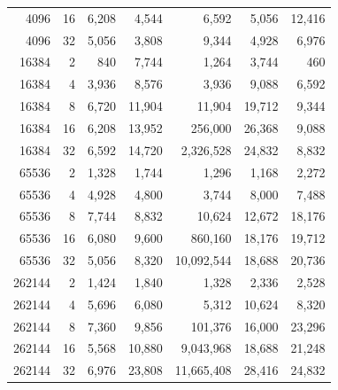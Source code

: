 \begin{table}[!htbp]
\begin{tabular}{rrrrrrr}
4096 & 16 & 6{,}208 & 4{,}544 & 6{,}592 & 5{,}056 & 12{,}416 \\
4096 & 32 & 5{,}056 & 3{,}808 & 9{,}344 & 4{,}928 & 6{,}976 \\
16384 & 2 & 840 & 7{,}744 & 1{,}264 & 3{,}744 & 460 \\
16384 & 4 & 3{,}936 & 8{,}576 & 3{,}936 & 9{,}088 & 6{,}592 \\
16384 & 8 & 6{,}720 & 11{,}904 & 11{,}904 & 19{,}712 & 9{,}344 \\
16384 & 16 & 6{,}208 & 13{,}952 & 256{,}000 & 26{,}368 & 9{,}088 \\
16384 & 32 & 6{,}592 & 14{,}720 & 2{,}326{,}528 & 24{,}832 & 8{,}832 \\
65536 & 2 & 1{,}328 & 1{,}744 & 1{,}296 & 1{,}168 & 2{,}272 \\
65536 & 4 & 4{,}928 & 4{,}800 & 3{,}744 & 8{,}000 & 7{,}488 \\
65536 & 8 & 7{,}744 & 8{,}832 & 10{,}624 & 12{,}672 & 18{,}176 \\
65536 & 16 & 6{,}080 & 9{,}600 & 860{,}160 & 18{,}176 & 19{,}712 \\
65536 & 32 & 5{,}056 & 8{,}320 & 10{,}092{,}544 & 18{,}688 & 20{,}736 \\
262144 & 2 & 1{,}424 & 1{,}840 & 1{,}328 & 2{,}336 & 2{,}528 \\
262144 & 4 & 5{,}696 & 6{,}080 & 5{,}312 & 10{,}624 & 8{,}320 \\
262144 & 8 & 7{,}360 & 9{,}856 & 101{,}376 & 16{,}000 & 23{,}296 \\
262144 & 16 & 5{,}568 & 10{,}880 & 9{,}043{,}968 & 18{,}688 & 21{,}248 \\
262144 & 32 & 6{,}976 & 23{,}808 & 11{,}665{,}408 & 28{,}416 & 24{,}832 \\
\bottomrule
\end{tabular}
\end{table}
